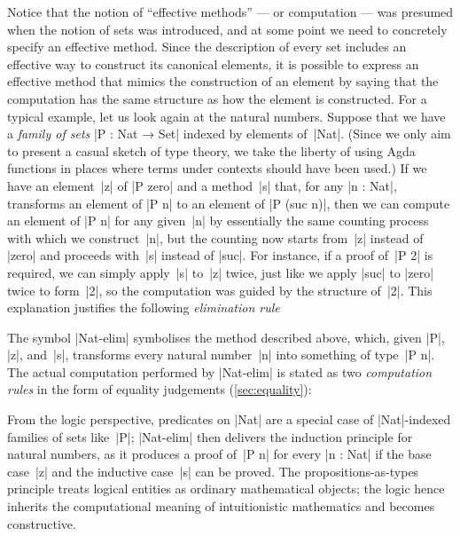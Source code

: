 Notice that the notion of ``effective methods'' --- or computation --- was presumed when the notion of sets was introduced, and at some point we need to concretely specify an effective method.
Since the description of every set includes an effective way to construct its canonical elements, it is possible to express an effective method that mimics the construction of an element by saying that the computation has the same structure as how the element is constructed.
For a typical example, let us look again at the natural numbers.
Suppose that we have a \emph{family of sets} |P : Nat → Set| indexed by elements of~|Nat|.
(Since we only aim to present a casual sketch of type theory, we take the liberty of using Agda functions in places where terms under contexts should have been used.)
If we have an element~|z| of |P zero| and a method~|s| that, for any |n : Nat|, transforms an element of |P n| to an element of |P (suc n)|, then we can compute an element of |P n| for any given~|n| by essentially the same counting process with which we construct~|n|, but the counting now starts from~|z| instead of |zero| and proceeds with~|s| instead of |suc|.
For instance, if a proof of~|P 2| is required, we can simply apply~|s| to~|z| twice, just like we apply |suc| to |zero| twice to form~|2|, so the computation was guided by the structure of~|2|.
This explanation justifies the following \emph{elimination rule}
\begin{center}
  
 \DP
\end{center}
The symbol |Nat-elim| symbolises the method described above, which, given |P|, |z|, and~|s|, transforms every natural number~|n| into something of type~|P n|.
The actual computation performed by |Nat-elim| is stated as two \emph{computation rules} in the form of equality judgements (\autoref{sec:equality}):
\begin{center}
  
 \DP
\end{center}
\begin{center}
  
 \DP
\end{center}
From the logic perspective, predicates on |Nat| are a special case of |Nat|-indexed families of sets like~|P|; |Nat-elim| then delivers the induction principle for natural numbers, as it produces a proof of~|P n| for every |n : Nat| if the base case~|z| and the inductive case~|s| can be proved.
The propositions-as-types principle treats logical entities as ordinary mathematical objects; the logic hence inherits the computational meaning of intuitionistic mathematics and becomes constructive.

